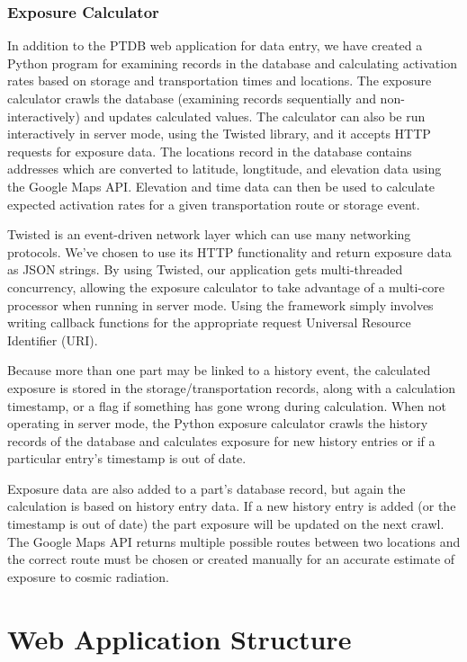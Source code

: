 \documentclass[journal]{IEEEtran}
\begin{document}
\subsubsection{Exposure Calculator}
In addition to the PTDB web application for data entry, we have created a Python program for
examining records in the database and calculating activation rates based on storage and 
transportation times and locations. The exposure calculator crawls the database (examining records
sequentially and non-interactively) and updates
calculated values.
The calculator can
also be run interactively in server mode, using the Twisted library, and it accepts HTTP requests for
exposure data. The locations record in the database contains addresses which
are converted to latitude, longtitude, and elevation data using the Google Maps API. Elevation and time data can
then be used to calculate expected activation rates for a given transportation route
or storage event.

Twisted is an event-driven network layer which can use many networking protocols. We've 
chosen to use its HTTP functionality and return exposure data as JSON strings. By
using Twisted, our application gets multi-threaded concurrency, allowing
the exposure calculator to take advantage of a multi-core processor when running in 
server mode. Using the framework simply involves writing callback functions for the appropriate request
Universal Resource Identifier (URI).

Because more than one part may be linked to a history event, the calculated exposure is
stored in the storage/transportation records, along with a calculation timestamp, or a flag
if something has gone wrong during calculation. When not operating in server mode, the Python
exposure calculator crawls the history records of the database and calculates exposure for
new history entries or if a particular entry's timestamp is out of date. 

Exposure data are also added to a part's database record, but again the calculation is based on history
entry data. If a new history entry is added (or the timestamp is out of date) the part
exposure will be updated on the next crawl. The Google Maps API returns multiple possible
routes between two locations and the correct route must be chosen or created
manually for an accurate estimate of exposure to cosmic radiation.

\section{Web Application Structure}
\end{document}
